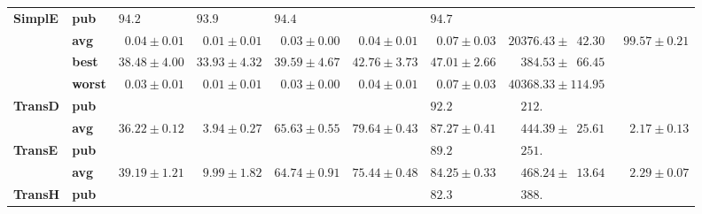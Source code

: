 \begin{tabular}{llrrrrrrr}
\textbf{SimplE} & \textbf{pub} &  $94.2\phantom{0 \pm 0.00}$ &  $93.9\phantom{0 \pm 0.00}$ &  $94.4\phantom{0 \pm 0.00}$ &                             &  $94.7\phantom{0 \pm 0.00}$ &                                            &                              \\
       & \textbf{avg} &  $\phantom{0}0.04 \pm 0.01$ &  $\phantom{0}0.01 \pm 0.01$ &  $\phantom{0}0.03 \pm 0.00$ &  $\phantom{0}0.04 \pm 0.01$ &  $\phantom{0}0.07 \pm 0.03$ &            $20376.43 \pm \phantom{0}42.30$ &  $\phantom{0}99.57 \pm 0.21$ \\
       & \textbf{best} &            $38.48 \pm 4.00$ &            $33.93 \pm 4.32$ &            $39.59 \pm 4.67$ &            $42.76 \pm 3.73$ &            $47.01 \pm 2.66$ &  $\phantom{00}384.53 \pm \phantom{0}66.45$ &                              \\
       & \textbf{worst} &  $\phantom{0}0.03 \pm 0.01$ &  $\phantom{0}0.01 \pm 0.01$ &  $\phantom{0}0.03 \pm 0.00$ &  $\phantom{0}0.04 \pm 0.01$ &  $\phantom{0}0.07 \pm 0.03$ &                      $40368.33 \pm 114.95$ &                              \\
\textbf{TransD} & \textbf{pub} &                             &                             &                             &                             &  $92.2\phantom{0 \pm 0.00}$ &  $\phantom{00}212.\phantom{00 \pm 000.00}$ &                              \\
       & \textbf{avg} &            $36.22 \pm 0.12$ &  $\phantom{0}3.94 \pm 0.27$ &            $65.63 \pm 0.55$ &            $79.64 \pm 0.43$ &            $87.27 \pm 0.41$ &  $\phantom{00}444.39 \pm \phantom{0}25.61$ &  $\phantom{00}2.17 \pm 0.13$ \\
\textbf{TransE} & \textbf{pub} &                             &                             &                             &                             &  $89.2\phantom{0 \pm 0.00}$ &  $\phantom{00}251.\phantom{00 \pm 000.00}$ &                              \\
       & \textbf{avg} &            $39.19 \pm 1.21$ &  $\phantom{0}9.99 \pm 1.82$ &            $64.74 \pm 0.91$ &            $75.44 \pm 0.48$ &            $84.25 \pm 0.33$ &  $\phantom{00}468.24 \pm \phantom{0}13.64$ &  $\phantom{00}2.29 \pm 0.07$ \\
\textbf{TransH} & \textbf{pub} &                             &                             &                             &                             &  $82.3\phantom{0 \pm 0.00}$ &  $\phantom{00}388.\phantom{00 \pm 000.00}$ &                              \\

\end{tabular}
